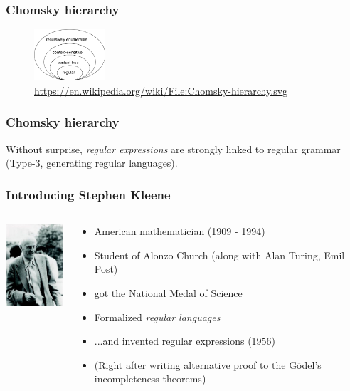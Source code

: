 \documentclass[aspectratio=169,xcolor=table]{beamer}
\begin{document}
\begin{frame}
  \frametitle{Chomsky hierarchy}
    \begin{figure}
      \begin{center}
        \includegraphics[width=100px]{images/Chomsky-hierarchy.png}
      \end{center}
      \caption{\url{https://en.wikipedia.org/wiki/File:Chomsky-hierarchy.svg}}
    \end{figure}
\end{frame}


\begin{frame}
  \frametitle{Chomsky hierarchy}
  Without surprise, \textit{regular expressions} are strongly linked
  to regular grammar (Type-3, generating regular languages).
\end{frame}


\begin{frame}
  \frametitle{Introducing Stephen Kleene}
  \begin{columns}[T]
    \begin{column}{.3\textwidth}
      \includegraphics[width=100px]{images/kleene.jpg}
    \end{column}
    \begin{column}{.7\textwidth}
      \begin{itemize}
      \item American mathematician (1909 - 1994) \pause
      \item Student of Alonzo Church (along with
        Alan Turing, Emil Post) \pause
      \item got the National Medal of Science \pause
      \item Formalized \textit{regular languages} \pause
      \item ...and invented regular expressions (1956) \pause
      \item (Right after writing alternative proof to the G\"odel's
        incompleteness theorems)
      \end{itemize}
    \end{column}
  \end{columns}
\end{frame}
\end{document}
